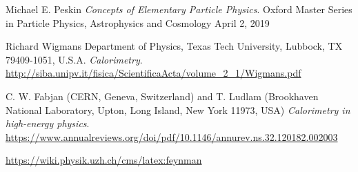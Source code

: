 
\cleardoublepage
{}
\begin{thebibliography}{99}

Michael E. Peskin
\textit{Concepts of Elementary Particle Physics}.
Oxford Master Series in Particle Physics, Astrophysics and Cosmology
April 2, 2019

Richard Wigmans
Department of Physics, Texas Tech University, Lubbock, TX 79409-1051, U.S.A.
\textit{Calorimetry}.
\url{http://siba.unipv.it/fisica/ScientificaActa/volume_2_1/Wigmans.pdf}

C. W. Fabjan (CERN, Geneva, Switzerland) and T. Ludlam (Brookhaven National Laboratory, Upton, Long Island, New York 11973, USA)
\textit{Calorimetry in high-energy physics}.
\url{https://www.annualreviews.org/doi/pdf/10.1146/annurev.ns.32.120182.002003}

\url{https://wiki.physik.uzh.ch/cms/latex:feynman}

\end{thebibliography}
